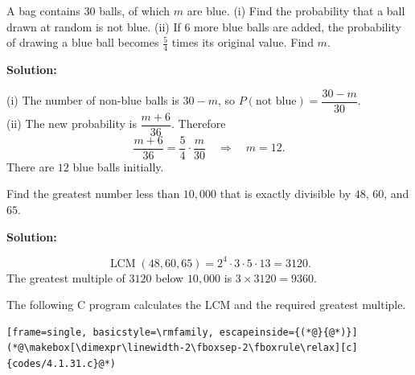 \documentclass[journal]{IEEEtran}
\begin{document}
\newpage
\begin{list}{}{\setlength{\leftmargin}{1.15cm}\setlength{\labelwidth}{1.0cm}\setlength{\labelsep}{0.15cm}\setlength{\itemindent}{0pt}\setlength{\listparindent}{0pt}\setlength{\parsep}{0pt}\setlength{\topsep}{0pt}}
\item[4.1.30] A bag contains 30 balls, of which $m$ are blue. (i) Find the probability that a ball drawn at random is not blue. (ii) If 6 more blue balls are added, the probability of drawing a blue ball becomes $\frac54$ times its original value. Find $m$.

\vspace{0.7em}\par\noindent\textbf{Solution:}

(i) The number of non-blue balls is $30-m$, so $P(\text{not blue})=\dfrac{30-m}{30}$.\\
(ii) The new probability is $\dfrac{m+6}{36}$. Therefore
\[
\frac{m+6}{36}=\frac54\cdot\frac{m}{30}
\quad\Longrightarrow\quad m=12.
\]
There are $12$ blue balls initially.
\end{list}

\vspace{1.2em}
\begin{list}{}{\setlength{\leftmargin}{1.15cm}\setlength{\labelwidth}{1.0cm}\setlength{\labelsep}{0.15cm}\setlength{\itemindent}{0pt}\setlength{\listparindent}{0pt}\setlength{\parsep}{0pt}\setlength{\topsep}{0pt}}
\item[4.1.31] Find the greatest number less than $10{,}000$ that is exactly divisible by $48$, $60$, and $65$.

\vspace{0.7em}\par\noindent\textbf{Solution:}

\[
\operatorname{LCM}(48,60,65)=2^4\cdot3\cdot5\cdot13=3120.
\]
The greatest multiple of $3120$ below $10{,}000$ is $3\times3120=\boxed{9360}$.

The following C program calculates the LCM and the required greatest multiple.
\begin{lstlisting}[frame=single, basicstyle=\rmfamily, escapeinside={(*@}{@*)}]
(*@\makebox[\dimexpr\linewidth-2\fboxsep-2\fboxrule\relax][c]{codes/4.1.31.c}@*)
\end{lstlisting}
\end{list}
\end{document}
